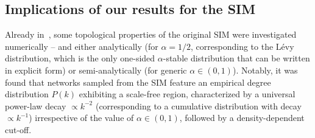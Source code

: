 \documentclass[11pt, reqno]{amsart}
\numberwithin{equation}{section}
\theoremstyle{plain} %
\theoremstyle{definition} %
\newcommand{\eps}{\varepsilon}
\newcommand{\revise}[1]{{\color{black}#1}}
\begin{document}


\subsection{Implications of our results for the SIM}
Already in~\cite{GMD2020}, some topological properties of the original SIM were investigated numerically -- and either analytically (for  $\alpha = 1/2$, corresponding to the L\'evy distribution, which is the only one-sided $\alpha$-stable distribution that can be written in explicit form) or semi-analytically (for generic $\alpha\in (0,1)$).
Notably, it was found that networks sampled from the SIM feature an empirical degree distribution $P(k)$ exhibiting  a scale-free region, characterized by a universal power-law decay $\propto k^{-2}$ (corresponding to a cumulative distribution with decay $\propto k^{-1}$) irrespective of the value of $\alpha\in(0,1)$, followed by a density-dependent cut-off. 
\end{document}
